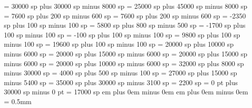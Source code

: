 \greinterwordspacetextnotes = 30000 sp plus 30000 sp minus 8000 sp
\greinterwordspacetext = 25000 sp plus 45000 sp minus 8000 sp
\grebitrivirspace = 7600 sp plus 200 sp minus 600 sp
\grebitristrospace = 7600 sp plus 200 sp minus 600 sp
\grepunctuminclinatumshift= -2350 sp plus 100 sp minus 100 sp
\grebeforepunctainclinatashift= 5800 sp plus 800 sp minus 500 sp
\grepunctuminclinatumanddebilisshift= -1700 sp plus 100 sp minus 100 sp
\grepunctuminclinatumdebilisshift= -100 sp plus 100 sp minus 100 sp
\grepunctuminclinatumbigshift= 9800 sp plus 100 sp minus 100 sp
\grepunctuminclinatummaxshift= 19600 sp plus 100 sp minus 100 sp
\grespacearoundsmallbar = 20000 sp plus 10000 sp minus 6000 sp
\grespacearoundminor = 20000 sp plus 15000 sp minus 6000 sp
\grespacearoundmaior = 20000 sp plus 15000 sp minus 6000 sp
\grespacearoundfinalis = 20000 sp plus 10000 sp minus 6000 sp
\grespacebeforefinalfinalis= 32000 sp plus 8000 sp minus 30000 sp
\grespacearoundclefbars= 4000 sp plus 500 sp minus 100 sp
\gretextbartextspace = 27000 sp plus 15000 sp minus 5400 sp
\grenotebarspace = 35000 sp plus 30000 sp minus 3100 sp
\gremaximumspacewithoutdash = 2200 sp
\greafterclefnospace = 0 pt plus 30000 sp minus 0 pt
\greadditionallineswidth = 17000 sp
 em plus 0em minus 0em
 em plus 0em minus 0em
\greminimalspaceatlinebeginning=1mm
\greaboveinitialseparation = 0.5mm

